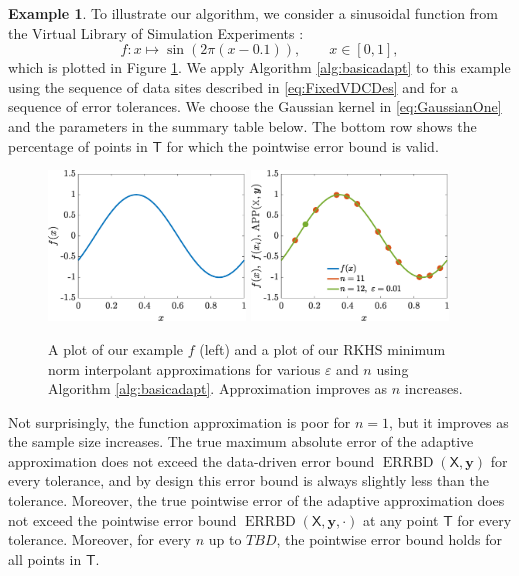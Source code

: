 \documentclass[]{mcom-l}
\theoremstyle{plain}
\theoremstyle{definition}
\newtheorem{example}{Example}
\DeclareMathOperator{\errBd}{ERRBD}
\newcommand{\mT}{\mathsf{T}}
\newcommand{\mX}{\mathsf{X}}
\newcommand{\by}{{\boldsymbol{y}}}
\begin{document}
\begin{example}
	\label{ex:adpsamplesize}
	To illustrate our algorithm, we consider a sinusoidal function \cite{CurEtal88b} from the Virtual Library of Simulation Experiments \cite{VirLib17a}:
	\begin{equation}
	f: x \mapsto  \sin(2\pi(x-0.1)), \qquad x \in [0,1],
	\end{equation}
	which is plotted in Figure \ref{fig:ex1}.  We apply Algorithm \ref{alg:basicadapt} to this example using the sequence of data sites described in \eqref{eq:FixedVDCDes} and for a sequence of error tolerances.  We choose the Gaussian kernel in \eqref{eq:GaussianOne} and the parameters in the summary table below.  The bottom row shows the percentage of points in $\mT$ for which the pointwise error bound is valid.
	
	
	
	\begin{figure}[H]
		\centering
		\includegraphics[height = 4cm]{ProgramsImages/sinFunPlot.eps} \qquad
		\includegraphics[height = 4cm]{ProgramsImages/AdaptAlgo1_sinFun_GaussKernel_adapt_th_EmpBayesAx_theta_1.eps}
		\caption{A plot of our example $f$ (left) and a plot of our RKHS minimum norm interpolant approximations for various $\varepsilon$ and  $n$ using Algorithm \ref{alg:basicadapt}.  Approximation improves as $n$ increases. \label{fig:ex1}}
	\end{figure}
	
Not surprisingly, the function approximation is poor for $n=1$, but it improves as the sample size increases.  The true  maximum absolute error of the adaptive approximation does not exceed the data-driven error bound $\errBd(\mX,\by)$ for every tolerance, and by design this error bound is always slightly less than the tolerance.  Moreover, the true pointwise error of the adaptive approximation does not exceed the pointwise error bound $\errBd(\mX,\by,\cdot)$ at any point $\mT$ for every tolerance.  Moreover, for every $n$ up to $TBD$, the pointwise error bound holds for all points in  $\mT$.
	
\end{example} 
\end{document}
